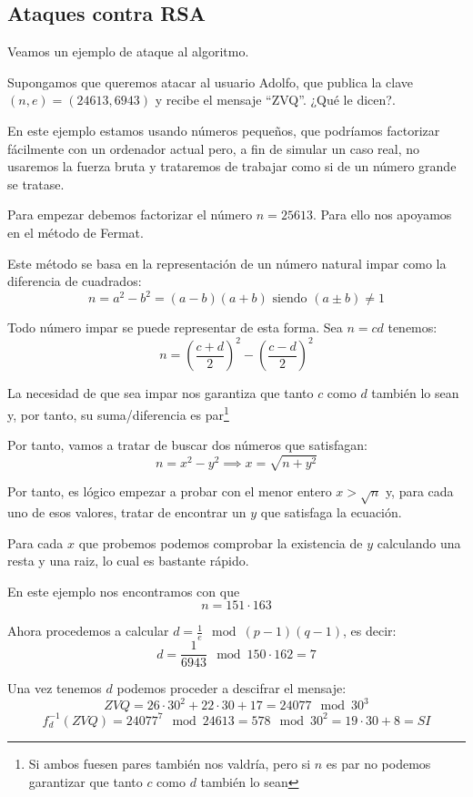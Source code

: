 \subsection{Ataques contra RSA}
Veamos un ejemplo de ataque al algoritmo.
\begin{example}
Supongamos que queremos atacar al usuario Adolfo, que publica la clave $(n,e) = (24613,6943)$ y recibe el mensaje ``ZVQ''. ¿Qué le dicen?.

\obs En este ejemplo estamos usando números pequeños, que podríamos factorizar fácilmente con un ordenador actual pero, a fin de simular un caso real, no usaremos la fuerza bruta y trataremos de trabajar como si de un número grande se tratase.

Para empezar debemos factorizar el número $n=25613$. Para ello nos apoyamos en el método de Fermat.

\begin{defn}
Este método se basa en la representación de un número natural impar como la diferencia de cuadrados:
\[n = a^2-b^2 = (a-b)(a+b) \text{ siendo } (a\pm b) \neq 1\]

\obs Todo número impar se puede representar de esta forma. Sea $n=cd$ tenemos:
\[n = \left( \frac{c+d}{2}\right)^2 - \left( \frac{c-d}{2}\right)^2\]

La necesidad de que sea impar nos garantiza que tanto $c$ como $d$ también lo sean y, por tanto, su suma/diferencia es par\footnote{Si ambos fuesen pares también nos valdría, pero si $n$ es par no podemos garantizar que tanto $c$ como $d$ también lo sean}
\end{defn}

Por tanto, vamos a tratar de buscar dos números que satisfagan:
\[n=x^2-y^2 \implies x = \sqrt{n+y^2}\]

Por tanto, es lógico empezar a probar con el menor entero $x>\sqrt{n}$ y, para cada uno de esos valores, tratar de encontrar un $y$ que satisfaga la ecuación.

Para cada $x$ que probemos podemos comprobar la existencia de $y$ calculando una resta y una raiz, lo cual es bastante rápido. 

En este ejemplo nos encontramos con que
\[n = 151 \cdot 163\]

Ahora procedemos a calcular $d=\frac{1}{e} \mod (p-1)(q-1)$, es decir:
\[d = \frac{1}{6943} \mod 150 \cdot 162 = 7 \]

Una vez tenemos $d$ podemos proceder a descifrar el mensaje:
\[ZVQ = 26 \cdot 30^2+22 \cdot 30 +17 = 24077 \mod 30^3\]
\[f_d^{-1}(ZVQ) = 24077^7 \mod 24613 = 578 \mod 30^2 = 19\cdot 30 +8 = SI\]
\end{example}

